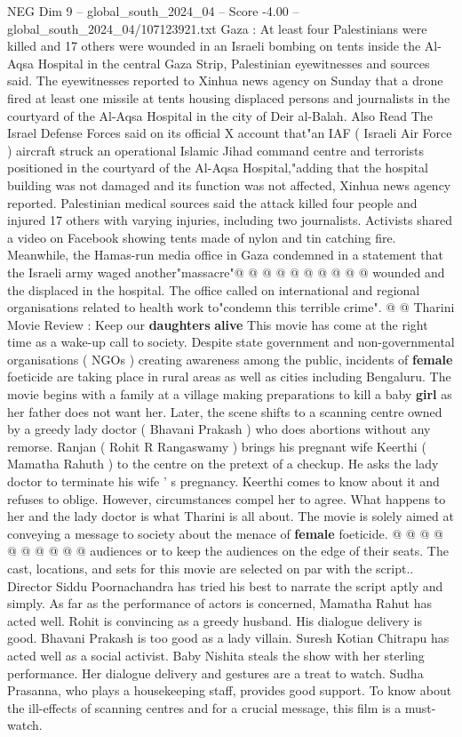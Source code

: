 \begin{textsample}{NEG Dim 9 – global\_south\_2024\_04 – Score -4.00 – global\_south\_2024\_04/107123921.txt}  \label{ex:f9_neg_330}
Gaza : At least four Palestinians were killed and 17 others were wounded in an Israeli bombing on tents inside the Al-Aqsa Hospital in the central Gaza Strip, Palestinian eyewitnesses and sources said.
The eyewitnesses reported to Xinhua news agency on Sunday that a drone fired at least one missile at tents housing displaced persons and journalists in the courtyard of the Al-Aqsa Hospital in the city of Deir al-Balah.
Also Read The Israel Defense Forces said on its official X account that"an IAF ( Israeli Air Force ) aircraft struck an operational Islamic Jihad command centre and terrorists positioned in the courtyard of the Al-Aqsa Hospital,"adding that the hospital building was not damaged and its function was not affected, Xinhua news agency reported.
Palestinian medical sources said the attack killed four people and injured 17 others with varying injuries, including two journalists.
Activists shared a video on Facebook showing tents made of nylon and tin catching fire.
Meanwhile, the Hamas-run media office in Gaza condemned in a statement that the Israeli army waged another"massacre"@ @ @ @ @ @ @ @ @ @ wounded and the displaced in the hospital.
The office called on international and regional organisations related to health work to"condemn this terrible crime". @ @ Tharini Movie Review : Keep our \textbf{daughters} \textbf{alive} This movie has come at the right time as a wake-up call to society.
Despite state government and non-governmental organisations ( NGOs ) creating awareness among the public, incidents of \textbf{female} foeticide are taking place in rural areas as well as cities including Bengaluru.
The movie begins with a family at a village making preparations to kill a baby \textbf{girl} as her father does not want her.
Later, the scene shifts to a scanning centre owned by a greedy lady doctor ( Bhavani Prakash ) who does abortions without any remorse.
Ranjan ( Rohit R Rangaswamy ) brings his pregnant wife Keerthi ( Mamatha Rahuth ) to the centre on the pretext of a checkup.
He asks the lady doctor to terminate his wife ' s pregnancy.
Keerthi comes to know about it and refuses to oblige.
However, circumstances compel her to agree.
What happens to her and the lady doctor is what Tharini is all about.
The movie is solely aimed at conveying a message to society about the menace of \textbf{female} foeticide. @ @ @ @ @ @ @ @ @ @ audiences or to keep the audiences on the edge of their seats.
The cast, locations, and sets for this movie are selected on par with the script..
Director Siddu Poornachandra has tried his best to narrate the script aptly and simply.
As far as the performance of actors is concerned, Mamatha Rahut has acted well.
Rohit is convincing as a greedy husband.
His dialogue delivery is good.
Bhavani Prakash is too good as a lady villain.
Suresh Kotian Chitrapu has acted well as a social activist.
Baby Nishita steals the show with her sterling performance.
Her dialogue delivery and gestures are a treat to watch.
Sudha Prasanna, who plays a housekeeping staff, provides good support.
To know about the ill-effects of scanning centres and for a crucial message, this film is a must-watch.

\end{textsample}
